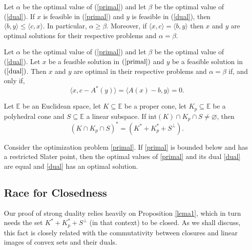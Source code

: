 \documentclass[a4paper]{article}
\begin{document}
\begin{theorem}\label{wd}
  Let $\alpha$ be the optimal value of (\ref{primal}) and let $\beta$ be the optimal
  value of (\ref{dual}). If $x$ is feasible in
  (\ref{primal}) and $y$ is feasible
  in (\ref{dual}), then $\langle b,y
  \rangle\leq \langle c,x\rangle$. In
  particular, $\alpha\geq\beta$. Moreover, if $\langle x ,c\rangle=\langle b,y\rangle$ then $x$ and $y$ are optimal solutions for their respective problems and $\alpha=\beta$.
\end{theorem}


\begin{corollary}
  Let $\alpha$ be the optimal value of (\ref{primal}) and 
  let $\beta$ be the optimal value of (\ref{dual}).
  Let $x$ be a feasible solution in $(\ref{primal})$ and
  $y$ be a feasible solution in $(\ref{dual})$. Then
  $x$ and $y$ are optimal in their respective problems and 
  $\alpha=\beta$ if, and only if,
  $$\langle x, c- A^\ast(y)\rangle = \langle A(x)-b,y\rangle=0.$$
\end{corollary}


\begin{lemma}\label{lema1}
  Let $\mathbb{E}$ be an Euclidean space, let \mbox{$K\subseteq\mathbb{E}$} be a proper
  cone, let \mbox{$K_p\subseteq\mathbb{E}$} be a polyhedral cone and
  $S\subseteq\mathbb{E}$ a linear subspace. If  $\mbox{int}(K)\cap K_p\cap
  S\neq\varnothing$, then $$(K\cap K_p\cap S)^\ast=(K^\ast+K^\ast_p+S^\bot).$$
\end{lemma}


\begin{theorem}\label{strongduality}
  Consider the optimization problem \eqref{primal}. If \eqref{primal} is bounded
  below and has a restricted Slater point, then the optimal values of
  \eqref{primal} and its dual \eqref{dual} are equal and \eqref{dual} has an
  optimal solution.
\end{theorem}


\subsection*{Race for Closedness}

Our proof of strong duality relies heavily on Proposition \ref{lema1},
which in turn needs the set \mbox{\(K^\ast+K_p^\ast+S^\bot\)} (in
that context) to be closed. As we shall discuss, this fact is closely related with the
commutativity between closures and linear images of convex sets and their duals.
\end{document}
